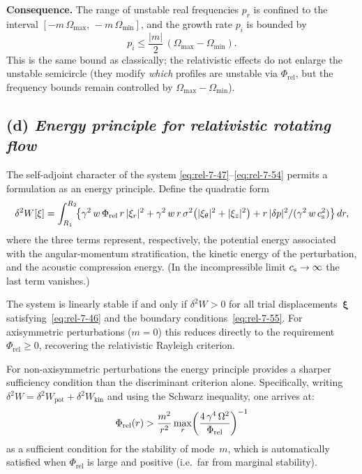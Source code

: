 \noindent\textbf{Consequence.}\quad
The range of unstable real frequencies $p_r$ is confined to the interval
$[-m\,\Omega_{\max},\,-m\,\Omega_{\min}]$, and the growth rate $p_i$
is bounded by
\begin{equation}
\label{eq:rel-howard-bound}
p_i \le \frac{|m|}{2}\,(\Omega_{\max}-\Omega_{\min}).
\end{equation}
This is the same bound as classically; the relativistic
effects do not enlarge the unstable semicircle (they modify
\emph{which} profiles are unstable via $\Phi_{\mathrm{rel}}$, but the
frequency bounds remain controlled by $\Omega_{\max}-\Omega_{\min}$).

\subsection*{(d) \emph{Energy principle for relativistic rotating flow}}
\label{sec:rel-7-67d}

The self-adjoint character of the system
\eqref{eq:rel-7-47}--\eqref{eq:rel-7-54} permits a formulation as an
energy principle.  Define the quadratic form
\begin{equation}
\label{eq:rel-7-energy}
\delta^{2}W[\xi]
= \int_{R_1}^{R_2}\!\bigl\{
  \gamma^{2}\,w\,\Phi_{\mathrm{rel}}\,r\,|\xi_r|^{2}
  + \gamma^{2}\,w\,r\,\sigma^{2}
    \bigl(|\xi_\theta|^{2}+|\xi_z|^{2}\bigr)
  + r\,|\delta p|^{2}/(\gamma^{2}\,w\,c_{\mathrm{s}}^{2})
\bigr\}\,dr,
\end{equation}
where the three terms represent, respectively, the potential energy
associated with the angular-momentum stratification, the kinetic
energy of the perturbation, and the acoustic compression energy.
(In the incompressible limit $c_{\mathrm{s}}\to\infty$ the last term vanishes.)

The system is linearly stable if and only if $\delta^{2}W>0$ for all
trial displacements~$\boldsymbol{\xi}$ satisfying~\eqref{eq:rel-7-46}
and the boundary conditions~\eqref{eq:rel-7-55}.  For axisymmetric
perturbations ($m=0$) this reduces directly to the requirement
$\Phi_{\mathrm{rel}}\ge0$, recovering the relativistic Rayleigh
criterion.

For non-axisymmetric perturbations the energy principle provides a
sharper sufficiency condition than the discriminant criterion alone.
Specifically, writing $\delta^{2}W = \delta^{2}W_{\mathrm{pot}}
+ \delta^{2}W_{\mathrm{kin}}$ and using the Schwarz inequality, one
arrives at:
\begin{equation}
\label{eq:rel-energy-suff}
\Phi_{\mathrm{rel}}(r) > \frac{m^{2}}{r^{2}}
  \max_{r}\!\left(\frac{4\,\gamma^{4}\,\Omega^{2}}
  {\Phi_{\mathrm{rel}}}\right)^{-1}
\end{equation}
as a sufficient condition for the stability of mode~$m$, which is
automatically satisfied when $\Phi_{\mathrm{rel}}$ is large and
positive (i.e.\ far from marginal stability).

